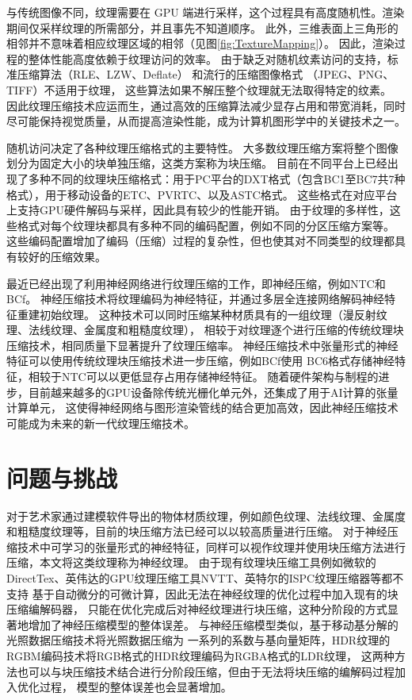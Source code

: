 与传统图像不同，纹理需要在 GPU 端进行采样，这个过程具有高度随机性。渲染期间仅采样纹理的所需部分，并且事先不知道顺序。
此外，三维表面上三角形的相邻并不意味着相应纹理区域的相邻（见图\ref{fig:TextureMapping}）。
因此，渲染过程的整体性能高度依赖于纹理访问的效率。
由于缺乏对随机纹素访问的支持，标准压缩算法（RLE、LZW、Deflate） 和流行的压缩图像格式 （JPEG、PNG、TIFF）不适用于纹理，
这些算法如果不解压整个纹理就无法取得特定的纹素。
因此纹理压缩技术应运而生，通过高效的压缩算法减少显存占用和带宽消耗，同时尽可能保持视觉质量，从而提高渲染性能，成为计算机图形学中的关键技术之一。

随机访问决定了各种纹理压缩格式的主要特性。
大多数纹理压缩方案将整个图像划分为固定大小的块单独压缩，这类方案称为块压缩。
目前在不同平台上已经出现了多种不同的纹理块压缩格式：用于PC平台的DXT格式（包含BC1至BC7共7种格式），用于移动设备的ETC、PVRTC、以及ASTC格式。
这些格式在对应平台上支持GPU硬件解码与采样，因此具有较少的性能开销。
由于纹理的多样性，这些格式对每个纹理块都具有多种不同的编码配置，例如不同的分区压缩方案等。
这些编码配置增加了编码（压缩）过程的复杂性，但也使其对不同类型的纹理都具有较好的压缩效果。

最近已经出现了利用神经网络进行纹理压缩的工作，即神经压缩，例如NTC\cite{vaidyanathan2023random}和BCf\cite{weinreich2024real}。
神经压缩技术将纹理编码为神经特征，并通过多层全连接网络解码神经特征重建初始纹理。
这种技术可以同时压缩某种材质具有的一组纹理（漫反射纹理、法线纹理、金属度和粗糙度纹理），
相较于对纹理逐个进行压缩的传统纹理块压缩技术，相同质量下显著提升了纹理压缩率。
神经压缩技术中张量形式的神经特征可以使用传统纹理块压缩技术进一步压缩，例如BCf\cite{weinreich2024real}使用
BC6格式存储神经特征，相较于NTC\cite{vaidyanathan2023random}可以以更低显存占用存储神经特征。
随着硬件架构与制程的进步，目前越来越多的GPU设备除传统光栅化单元外，还集成了用于AI计算的张量计算单元，
这使得神经网络与图形渲染管线的结合更加高效，因此神经压缩技术可能成为未来的新一代纹理压缩技术。

\section{问题与挑战}

对于艺术家通过建模软件导出的物体材质纹理，例如颜色纹理、法线纹理、金属度和粗糙度纹理等，目前的块压缩方法已经可以以较高质量进行压缩。
对于神经压缩技术中可学习的张量形式的神经特征，同样可以视作纹理并使用块压缩方法进行压缩，本文将这类纹理称为神经纹理。
由于现有纹理块压缩工具例如微软的DirectTex、英伟达的GPU纹理压缩工具NVTT、英特尔的ISPC纹理压缩器等都不支持
基于自动微分的可微计算，因此无法在神经纹理的优化过程中加入现有的块压缩编解码器，
只能在优化完成后对神经纹理进行块压缩，这种分阶段的方式显著地增加了神经压缩模型的整体误差。
与神经压缩模型类似，基于移动基分解的光照数据压缩技术\cite{silvennoinen2021moving}将光照数据压缩为
一系列的系数与基向量矩阵，HDR纹理的RGBM编码技术将RGB格式的HDR纹理编码为RGBA格式的LDR纹理，
这两种方法也可以与块压缩技术结合进行分阶段压缩，但由于无法将块压缩的编解码过程加入优化过程，
模型的整体误差也会显著增加。

